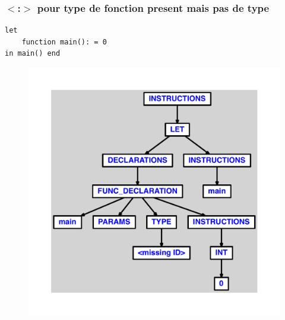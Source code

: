 \documentclass{article}
\begin{document}
\subsubsection{$ < $:$ > $ pour type de fonction present mais pas de type}
\begin{lstlisting}
let
	function main(): = 0
in main() end
\end{lstlisting}
\newpage
\begin{figure}[H]
\centering
\includegraphics[max width=\textwidth]{ast/ast_222.pdf}
\end{figure}
\newpage
\end{document}
